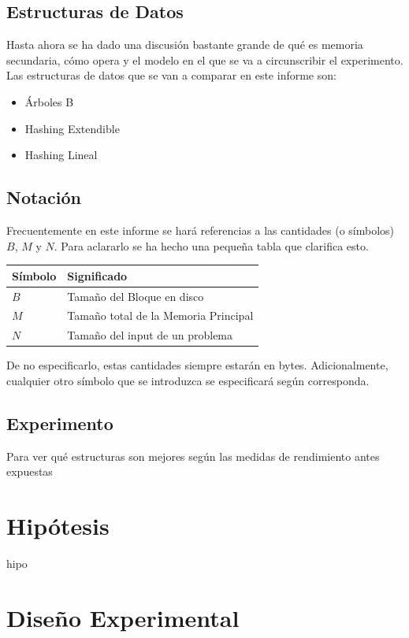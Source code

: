 \documentclass[12pt,letterpaper]{report}
\begin{document}
\subsection{Estructuras de Datos}
Hasta ahora se ha dado una discusión bastante grande de qué es memoria secundaria, cómo opera y el modelo en el que se va a circunscribir el experimento. Las estructuras de datos que se van a comparar en este informe son:

\begin{itemize}
\item Árboles B
\item Hashing Extendible
\item Hashing Lineal
\end{itemize}

\subsection{Notación}

Frecuentemente en este informe se hará referencias a las cantidades (o símbolos) $B$, $M$ y $N$. Para aclararlo se ha hecho una pequeña tabla que clarifica esto.

\begin{center}
\begin{tabular}{l|l}
Símbolo & Significado \\ \hline
$B$ & Tamaño del Bloque en disco \\
$M$ & Tamaño total de la Memoria Principal \\
$N$ & Tamaño del input de un problema
\end{tabular}
\end{center}

De no especificarlo, estas cantidades siempre estarán en bytes. Adicionalmente, cualquier otro símbolo que se introduzca se especificará según corresponda.

\subsection{Experimento}

Para ver qué estructuras son mejores según las medidas de rendimiento antes expuestas 


\newpage
\section{Hipótesis}
hipo


\newpage
\section{Diseño Experimental}
\end{document}
